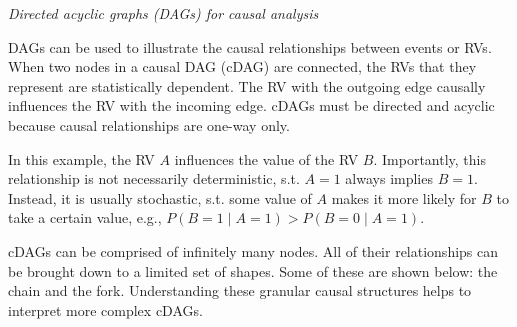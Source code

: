 \documentclass[nobib]{tufte-handout}
\begin{document}
\begin{InfoBox}
\centering
 \colorbox{mygray}{
    \begin{minipage}{1\textwidth}
    \medskip
    \emph{Directed acyclic graphs (DAGs) for causal analysis}
    \medskip

    DAGs can be used to illustrate the causal relationships between events or RVs. 
    When two nodes in a causal DAG (cDAG) are connected, the RVs that they represent are statistically dependent.
    The RV with the outgoing edge causally influences the RV with the incoming edge.
    cDAGs must be directed and acyclic because causal relationships are one-way only. 
    \begin{center}
    \end{center}
    In this example, the RV $A$ influences the value of the RV $B$. 
    Importantly, this relationship is not necessarily  deterministic, s.t. $A=1$ always implies $B=1$. 
    Instead, it is usually stochastic, s.t. some value of $A$ makes it more likely for $B$ to take a certain value, e.g., $P(B=1 \mid A=1) > P(B=0 \mid A=1)$.

    cDAGs can be comprised of infinitely many nodes.
    All of their relationships can be brought down to a limited set of shapes.
    Some of these are shown below: the chain and the fork.
    Understanding these granular causal structures helps to interpret more complex cDAGs.
    
    \begin{center}
\end{center}
\end{minipage}}
\end{InfoBox}
\end{document}
